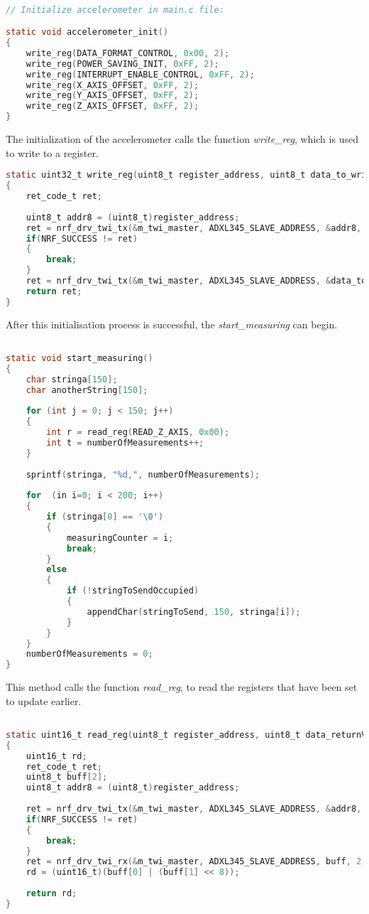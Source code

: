 \begin{lstlisting}[language=C]

// Initialize accelerometer in main.c file: 

static void accelerometer_init()
{
	write_reg(DATA_FORMAT_CONTROL, 0x00, 2);
	write_reg(POWER_SAVING_INIT, 0xFF, 2);
	write_reg(INTERRUPT_ENABLE_CONTROL, 0xFF, 2);
	write_reg(X_AXIS_OFFSET, 0xFF, 2);
	write_reg(Y_AXIS_OFFSET, 0xFF, 2);
	write_reg(Z_AXIS_OFFSET, 0xFF, 2);	
}

\end{lstlisting}

The initialization of the accelerometer calls the function \textit{write\_reg}, which is used to write to a register. 

\begin{lstlisting}[language=C]
static uint32_t write_reg(uint8_t register_address, uint8_t data_to_write, uint8_t size) 
{		
	ret_code_t ret;
	
    uint8_t addr8 = (uint8_t)register_address;
    ret = nrf_drv_twi_tx(&m_twi_master, ADXL345_SLAVE_ADDRESS, &addr8, 1, true);
    if(NRF_SUCCESS != ret)
    {
        break;
    }
    ret = nrf_drv_twi_tx(&m_twi_master, ADXL345_SLAVE_ADDRESS, &data_to_write, size, false);
    return ret;
}

\end{lstlisting}

After this initialisation process is successful, the \textit{start\_measuring} can begin. 

\begin{lstlisting}[language=C]

static void start_measuring()
{
	char stringa[150];
	char anotherString[150];
	
	for (int j = 0; j < 150; j++)
	{	
		int r = read_reg(READ_Z_AXIS, 0x00);
		int t = numberOfMeasurements++;
	}
	
	sprintf(stringa, "%d,", numberOfMeasurements);
	
	for  (in i=0; i < 200; i++)
	{
		if (stringa[0] == '\0')
		{
			measuringCounter = i;
			break;
		}
		else
		{
			if (!stringToSendOccupied)
			{
				appendChar(stringToSend, 150, stringa[i]);
			}
		}
	}
	numberOfMeasurements = 0; 
}

\end{lstlisting}

This method calls the function \textit{read\_reg}, to read the registers that have been set to update earlier. 

\begin{lstlisting}[language=C]

static uint16_t read_reg(uint8_t register_address, uint8_t data_returnValue) 
{
	uint16_t rd;
	ret_code_t ret;
	uint8_t buff[2];
    uint8_t addr8 = (uint8_t)register_address;
    
    ret = nrf_drv_twi_tx(&m_twi_master, ADXL345_SLAVE_ADDRESS, &addr8, 1, true);
    if(NRF_SUCCESS != ret)
    {
        break;
    }
    ret = nrf_drv_twi_rx(&m_twi_master, ADXL345_SLAVE_ADDRESS, buff, 2, false);
	rd = (uint16_t)(buff[0] | (buff[1] << 8));
    
    return rd;	
}

\end{lstlisting}

